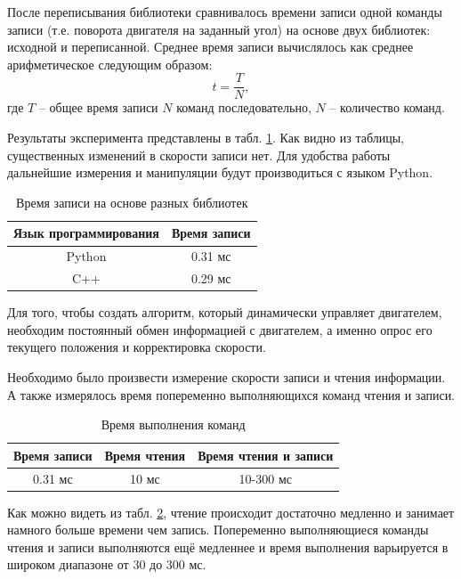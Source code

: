 \documentclass{article}
\begin{document}
После переписывания библиотеки сравнивалось времени записи одной команды записи (т.е. поворота двигателя на заданный угол) на основе двух библиотек: исходной и переписанной. Среднее время записи  вычислялось как среднее арифметическое следующим образом:
\[t = \frac{T}{N},\] где $T$ -- общее время записи $N$ команд последовательно, $N$ -- количество команд.

Результаты эксперимента представлены в табл. \ref{tab:compar1}. Как видно из таблицы, существенных изменений в скорости записи нет. Для удобства работы дальнейшие измерения и манипуляции будут производиться с языком Python.

\begin{table}[h]
\centering
\begin{tabular}{|c|c|}
    \hline
    Язык программирования & Время записи \\
    \hline \hline
    Python & 0.31 мс \\
    \hline
    C++ & 0.29 мс \\
    \hline
\end{tabular}
\caption{Время записи на основе разных библиотек}
\label{tab:compar1}
\end{table}

Для того, чтобы создать алгоритм, который динамически управляет двигателем, необходим постоянный обмен информацией с двигателем, а именно опрос его текущего положения и корректировка скорости.

Необходимо было произвести измерение скорости записи и чтения информации. А также измерялось время попеременно выполняющихся команд чтения и записи. 

\begin{table}[h]
\centering
\begin{tabular}{|c|c|c|}
    \hline
    Время записи & Время чтения & Время чтения и записи \\
    \hline \hline
    0.31 мс & 10 мс & 10-300 мс \\
    \hline
\end{tabular}
\caption{Время выполнения команд}
\label{tab:compar2}
\end{table}

Как можно видеть из табл. \ref{tab:compar2}, чтение происходит достаточно медленно и занимает намного больше времени чем запись. Попеременно выполняющиеся команды чтения и записи выполняются ещё медленнее и время выполнения варьируется в широком диапазоне от 30 до 300 мс.

\newpage
\end{document}

